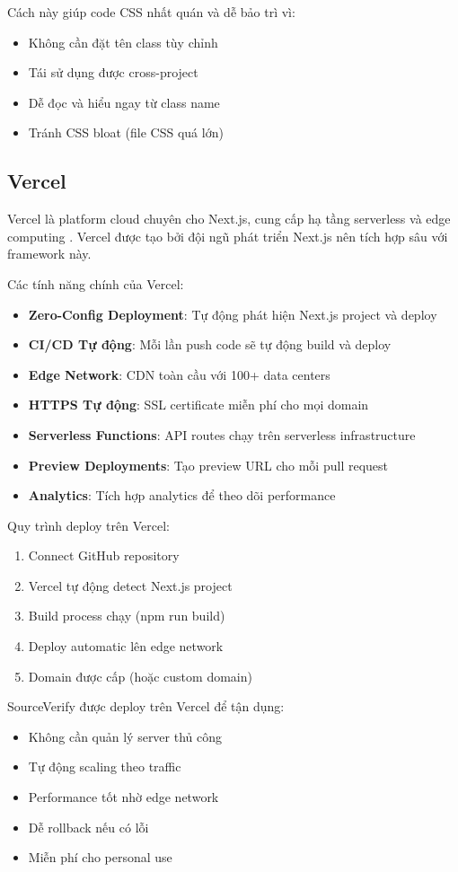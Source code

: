 \documentclass[14pt,a4paper,oneside]{report}
\begin{document}
Cách này giúp code CSS nhất quán và dễ bảo trì vì:
\begin{itemize}
  \item Không cần đặt tên class tùy chỉnh
  \item Tái sử dụng được cross-project
  \item Dễ đọc và hiểu ngay từ class name
  \item Tránh CSS bloat (file CSS quá lớn)
\end{itemize}

\subsection{Vercel}
Vercel là platform cloud chuyên cho Next.js, cung cấp hạ tầng serverless và edge computing \cite{nextjs}. Vercel được tạo bởi đội ngũ phát triển Next.js nên tích hợp sâu với framework này.

Các tính năng chính của Vercel:
\begin{itemize}
  \item \textbf{Zero-Config Deployment}: Tự động phát hiện Next.js project và deploy
  \item \textbf{CI/CD Tự động}: Mỗi lần push code sẽ tự động build và deploy
  \item \textbf{Edge Network}: CDN toàn cầu với 100+ data centers
  \item \textbf{HTTPS Tự động}: SSL certificate miễn phí cho mọi domain
  \item \textbf{Serverless Functions}: API routes chạy trên serverless infrastructure
  \item \textbf{Preview Deployments}: Tạo preview URL cho mỗi pull request
  \item \textbf{Analytics}: Tích hợp analytics để theo dõi performance
\end{itemize}

Quy trình deploy trên Vercel:
\begin{enumerate}
  \item Connect GitHub repository
  \item Vercel tự động detect Next.js project
  \item Build process chạy (npm run build)
  \item Deploy automatic lên edge network
  \item Domain được cấp (hoặc custom domain)
\end{enumerate}

SourceVerify được deploy trên Vercel để tận dụng:
\begin{itemize}
  \item Không cần quản lý server thủ công
  \item Tự động scaling theo traffic
  \item Performance tốt nhờ edge network
  \item Dễ rollback nếu có lỗi
  \item Miễn phí cho personal use
\end{itemize}
\end{document}
